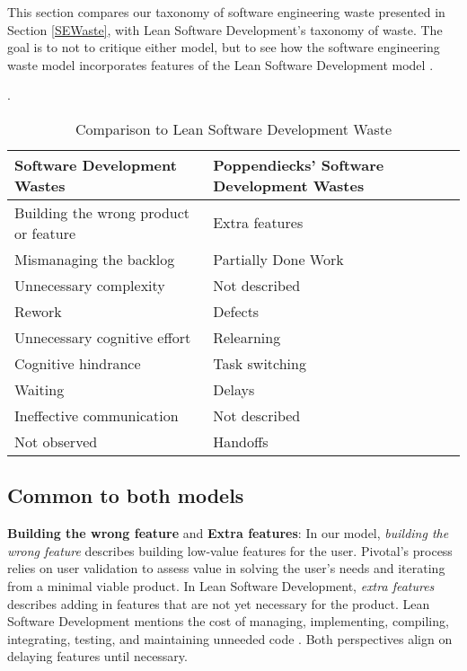 This section compares our taxonomy of software engineering waste presented in Section \ref{SEWaste}, with Lean Software Development's taxonomy of waste. The goal is to not to critique either model, but to see how the software engineering waste model incorporates features of the Lean Software Development model \cite{PoppendieckConceptToCash}. 

 \cite{GlaserTheoreticalSensitivity}. 


\begin{table}[t]
\renewcommand{\arraystretch}{1.5}
\centering
\caption{Comparison to Lean Software Development Waste}
\label{LeanSoftwareDevelopmentComparison}
\begin{tabular}{|l|l|}
\hline
Software Development Wastes           & Poppendiecks' Software Development Wastes \\ \hline
Building the wrong product or feature & Extra features                            \\ \hline
Mismanaging the backlog               & Partially Done Work                            \\ \hline
Unnecessary complexity                & Not described                             \\ \hline
Rework                                & Defects                                   \\ \hline
Unnecessary cognitive effort          & Relearning                             \\ \hline
Cognitive hindrance           & Task switching                             \\ \hline
Waiting                               & Delays                                    \\ \hline
Ineffective communication             & Not described                             \\ \hline
Not observed                          & Handoffs                                  \\ \hline
\end{tabular}
\end{table}
\subsection{Common to both models}
\textbf{Building the wrong feature} and \textbf{Extra features}: In our model, \textit{building the wrong feature} describes building low-value features for the user. Pivotal's process relies on user validation to assess value in solving the user's needs and iterating from a minimal viable product. In Lean Software Development, \textit{extra features} describes adding in features that are not yet necessary for the product. Lean Software Development mentions the cost of managing, implementing, compiling, integrating, testing, and maintaining unneeded code \cite{PoppendieckLeanSoftwareDevelopment}.  Both perspectives align on delaying features until necessary. 

